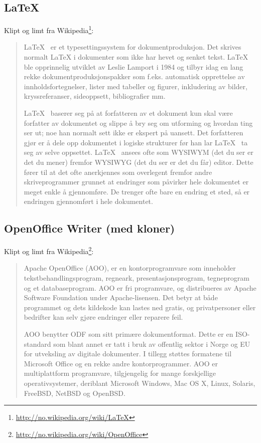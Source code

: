 \subsection{\LaTeX}

Klipt og limt fra Wikipedia\footnote{\url{http://no.wikipedia.org/wiki/LaTeX}}:

\begin{quotation}
\LaTeX~ er et typesettingssystem for dokumentproduksjon. Det skrives normalt LaTeX i dokumenter som ikke har hevet og senket tekst.
\LaTeX~ ble opprinnelig utviklet av Leslie Lamport i 1984 og tilbyr idag en lang rekke dokumentproduksjonspakker som f.eks. automatisk opprettelse av innholdsfortegnelser, lister med tabeller og figurer, inkludering av bilder, kryssreferanser, sideoppsett, bibliografier mm.


LaTeX~ baserer seg på at forfatteren av et dokument kun skal være forfatter av dokumentet og slippe å bry seg om utforming og hvordan ting ser ut; noe han normalt sett ikke er ekspert på uansett. Det forfatteren gjør er å dele opp dokumentet i logiske strukturer før han lar LaTeX~ ta seg av selve oppsettet. LaTeX~ ansees ofte som WYSIWYM (det du ser er det du mener) fremfor WYSIWYG (det du ser er det du får) editor. Dette fører til at det ofte anerkjennes som overlegent fremfor andre skriveprogrammer grunnet at endringer som påvirker hele dokumentet er meget enkle å gjennomføre. De trenger ofte bare en endring et sted, så er endringen gjennomført i hele dokumentet.
\end{quotation}


\subsection{OpenOffice Writer (med kloner)}

Klipt og limt fra Wikipedia\footnote{\url{http://no.wikipedia.org/wiki/OpenOffice}}:

\begin{quotation}
Apache OpenOffice (AOO), er en kontorprogramvare som inneholder tekstbehandlingsprogram, regneark, presentasjonsprogram, tegneprogram og et databaseprogram. AOO er fri programvare, og distribueres av Apache Software Foundation under Apache-lisensen. Det betyr at både programmet og dets kildekode kan lastes ned gratis, og privatpersoner eller bedrifter kan selv gjøre endringer eller reparere feil. 

AOO benytter ODF som sitt primære dokumentformat. Dette er en ISO-standard som blant annet er tatt i bruk av offentlig sektor i Norge og EU for utveksling av digitale dokumenter. I tillegg støttes formatene til Microsoft Office og en rekke andre kontorprogrammer. AOO er multiplattform programvare, tilgjengelig for mange forskjellige operativsystemer, deriblant Microsoft Windows, Mac OS X, Linux, Solaris, FreeBSD, NetBSD og OpenBSD.
\end{quotation}

